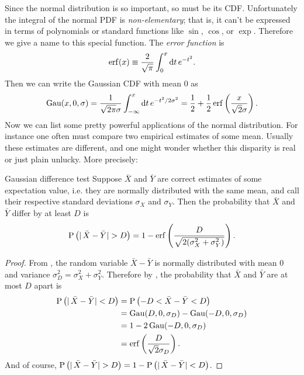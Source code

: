Since the normal distribution is so important, so must be its CDF.
Unfortunately the integral of the normal PDF is {\it non-elementary};
 that is, it can't be expressed in terms of
polynomials or standard
functions like $\sin$, $\cos$, or $\exp$. Therefore we give a name
to this special function.
The {\it error function} is
\begin{equation}
  \erf(x)\equiv\frac{2}{\sqrt{\pi}}\int_0^x\dd{t}e^{-t^2}.
\end{equation}
Then we can write the Gaussian CDF with mean 0 as
\begin{equation}
  \label{eq:gaussCDF}
  \Gau(x,0,\sigma)=\frac{1}{\sqrt{2\pi}\sigma}
                   \int_{-\infty}^x\dd{t}e^{-t^2/2\sigma^2}
                  =\frac{1}{2}+\frac{1}{2}
                   \erf\left(\frac{x}{\sqrt{2}\sigma}\right).
\end{equation}
Now we can list some pretty powerful applications of the normal distribution.
For instance one often must compare two empirical estimates of some mean.
Usually these estimates are different, and one might wonder whether this
disparity is real or just plain unlucky. More precisely:
\begin{theorem}{Gaussian difference test}{}\label{thm:gaudif}
  Suppose $\bar{X}$ and $\bar{Y}$ are correct estimates of
  some expectation
  value, i.e. they are normally distributed with the same mean, and call
  their respective standard deviations $\sigma_X$ and
  $\sigma_Y$. Then the probability that $\bar{X}$
  and $\bar{Y}$ differ by at least $D$ is
  \begin{equation*}
    \pr{|\,\bar{X}-\bar{Y}|>D}=1-\erf\left(\frac{D}
       {\sqrt{2(\sigma_X^2+\sigma_Y^2)}}\right).
  \end{equation*}
  \begin{proof}
    From , the random variable
    $\bar{X}-\bar{Y}$ is normally distributed with mean 0
    and variance $\sigma_D^2=\sigma_X^2+\sigma_Y^2$. Therefore by
    , the probability that $\bar{X}$ and
    $\bar{Y}$ are at most $D$ apart is
    \begin{equation*}
      \begin{aligned}
        \pr{|\,\bar{X}-\bar{Y}|<D}
            &=\pr{-D<\bar{X}-\bar{Y}<D}\\
            &=\Gau(D,0,\sigma_D)-\Gau(-D,0,\sigma_D)\\
            &=1-2\Gau(-D,0,\sigma_D)\\
            &=\erf\left(\frac{D}{\sqrt{2}\sigma_D}\right).
      \end{aligned}
    \end{equation*}
    And of course, $\pr{|\,\bar{X}-\bar{Y}|>D}
     =1-\pr{|\,\bar{X}-\bar{Y}|<D}$.
  \end{proof}
\end{theorem}
